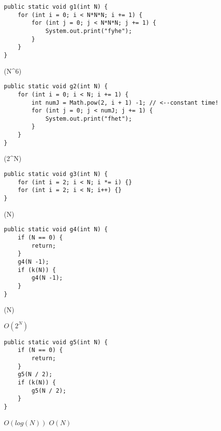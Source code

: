 \begin{lstlisting}
public static void g1(int N) {
	for (int i = 0; i < N*N*N; i += 1) {
		for (int j = 0; j < N*N*N; j += 1) {
			System.out.print("fyhe");
		}
	}
}
\end{lstlisting}
\begin{solution}
\Theta(N^6)
\end{solution}

\begin{lstlisting}
public static void g2(int N) {
	for (int i = 0; i < N; i += 1) {
		int numJ = Math.pow(2, i + 1) -1; // <--constant time!
		for (int j = 0; j < numJ; j += 1) {
			System.out.print("fhet");
		}
	}
}
\end{lstlisting}
\begin{solution}
\Theta(2^N)
\end{solution}

\begin{lstlisting}
public static void g3(int N) {
	for (int i = 2; i < N; i *= i) {}
	for (int i = 2; i < N; i++) {}
}
\end{lstlisting}
\begin{solution}
\Theta(N)
\end{solution}

\begin{lstlisting}
public static void g4(int N) {
	if (N == 0) { 
		return; 
	}
	g4(N -1);
	if (k(N)) { 
		g4(N -1); 
	}
}
\end{lstlisting}
\begin{solution}
\Theta(N)
\end{solution}

$O(2^N)$
\begin{lstlisting}
public static void g5(int N) {
	if (N == 0) { 
		return; 
	}
	g5(N / 2);
	if (k(N)) { 
		g5(N / 2); 
	}
}
\end{lstlisting}
$O(log(N))$
$O(N)$